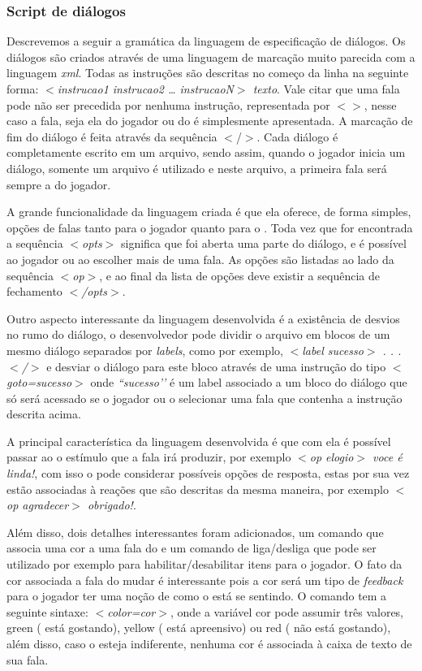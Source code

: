 \subsubsection{Script de diálogos}
Descrevemos a seguir a gramática da linguagem de especificação de diálogos.
Os diálogos são criados através de uma linguagem de marcação muito parecida com a linguagem \emph{xml}. Todas as instruções são descritas no começo da linha na seguinte forma: \emph{$<$instrucao1 instrucao2 … instrucaoN$>$ texto}. Vale citar que uma fala pode não ser precedida por nenhuma instrução, representada por \emph{$<>$}, nesse caso a fala, seja ela do jogador ou do \npc{} é simplesmente apresentada. A marcação de fim do diálogo é feita através da sequência $<$/$>$.
Cada diálogo é completamente escrito em um arquivo, sendo assim, quando o jogador inicia um diálogo, somente um arquivo é utilizado e neste arquivo, a primeira fala será sempre a do jogador.

A grande funcionalidade da linguagem criada é que ela oferece, de forma simples, opções de falas tanto para o jogador quanto para o \npc{}. Toda vez que for encontrada a sequência \emph{$<$opts$>$} significa que foi aberta uma parte do diálogo, e é possível ao jogador ou ao \npc{} escolher mais de uma fala. As opções são listadas ao lado da sequência \emph{$<$op$>$}, e ao final da lista de opções deve existir a sequência de fechamento \emph{$<$/opts$>$}.

Outro aspecto interessante da linguagem desenvolvida é a existência de desvios no rumo do diálogo, o desenvolvedor pode dividir o arquivo em blocos de um mesmo diálogo separados por \emph{labels}, como por exemplo, \emph{$<$label sucesso$>$ . . . $<$/$>$} e desviar o diálogo para este bloco através de uma instrução do tipo \emph{$<$goto=sucesso$>$} onde \emph{``sucesso’’} é um label associado a um bloco do diálogo que só será acessado se o jogador ou o \npc{} selecionar uma fala que contenha a instrução descrita acima.

A principal característica da linguagem desenvolvida é que com ela é possível passar ao \npc{} o estímulo que a fala irá produzir, por exemplo \emph{$<$op elogio$>$ voce é linda!}, com isso o \npc pode considerar possíveis opções de resposta, estas por sua vez estão associadas à reações que são descritas da mesma maneira, por exemplo \emph{$<$op agradecer$>$ obrigado!}. 

Além disso, dois detalhes interessantes foram adicionados, um comando que associa uma cor a uma fala do \npc{} e um comando de liga/desliga que pode ser utilizado por exemplo para habilitar/desabilitar itens para o jogador. O fato da cor associada a fala do \npc{} mudar é interessante pois a cor será um tipo de \emph{feedback} para o jogador ter uma noção de como o \npc{} está se sentindo. O comando tem a seguinte sintaxe: \emph{$<$color=cor$>$}, onde a variável cor pode assumir três valores, green (\npc{} está gostando), yellow (\npc{} está apreensivo) ou red (\npc{} não está gostando), além disso, caso o \npc{} esteja indiferente, nenhuma cor é associada à caixa de texto de sua fala. 


